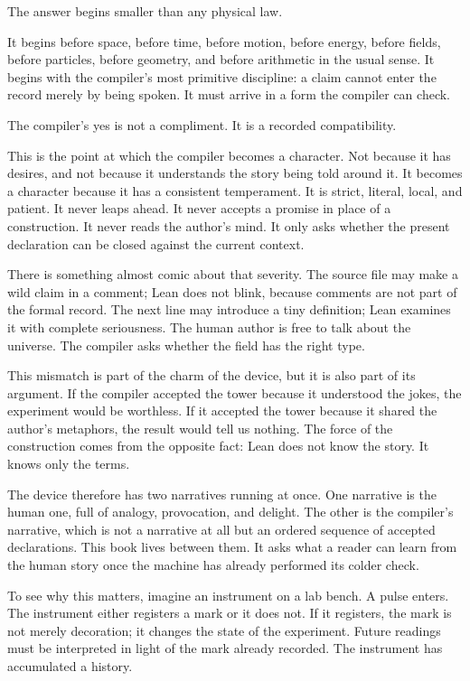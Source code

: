 The answer begins smaller than any physical law.

It begins before space, before time, before motion, before energy, before
fields, before particles, before geometry, and before arithmetic in the usual
sense. It begins with the compiler's most primitive discipline: a claim cannot
enter the record merely by being spoken. It must arrive in a form the compiler
can check.

The compiler's yes is not a compliment. It is a recorded compatibility.

This is the point at which the compiler becomes a character. Not because it has
desires, and not because it understands the story being told around it. It
becomes a character because it has a consistent temperament. It is strict,
literal, local, and patient. It never leaps ahead. It never accepts a promise in
place of a construction. It never reads the author's mind. It only asks whether
the present declaration can be closed against the current context.

There is something almost comic about that severity. The source file may make a
wild claim in a comment; Lean does not blink, because comments are not part of
the formal record. The next line may introduce a tiny definition; Lean examines
it with complete seriousness. The human author is free to talk about the
universe. The compiler asks whether the field has the right type.

This mismatch is part of the charm of the device, but it is also part of its
argument. If the compiler accepted the tower because it understood the jokes,
the experiment would be worthless. If it accepted the tower because it shared
the author's metaphors, the result would tell us nothing. The force of the
construction comes from the opposite fact: Lean does not know the story. It
knows only the terms.

The device therefore has two narratives running at once. One narrative is the
human one, full of analogy, provocation, and delight. The other is the compiler's
narrative, which is not a narrative at all but an ordered sequence of accepted
declarations. This book lives between them. It asks what a reader can learn
from the human story once the machine has already performed its colder check.

To see why this matters, imagine an instrument on a lab bench. A pulse enters.
The instrument either registers a mark or it does not. If it registers, the mark
is not merely decoration; it changes the state of the experiment. Future
readings must be interpreted in light of the mark already recorded. The
instrument has accumulated a history.

